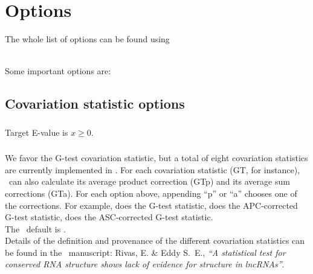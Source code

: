 \clearpage
\section{Options}
\label{section:options}
\setcounter{footnote}{0}

The whole list of options can be found using 

\\

Some important options are:
\subsection{Covariation statistic options}

\subsubsection{}  Target E-value is $x\geq 0$.

\subsubsection{}
We favor the G-test covariation statistic, but a total of eight
covariation statistics are currently implemented in \rscape. For each
covariation statistic (GT, for instance), \rscape\ can also calculate
its average product correction (GTp) and its average sum corrections
(GTa). For each option above, appending ``p'' or ``a'' chooses one of the
corrections. For example,  does the G-test statistic,
 does the APC-corrected G-test statistic, 
does the ASC-corrected G-test statistic.\\

The \rscape\ default is .\\

Details of the definition and provenance of the different covariation
statistics can be found in the \rscape\ manuscript: Rivas, E. \& Eddy
S.~E., \textit{``A statistical test for conserved RNA structure shows
lack of evidence for structure in lncRNAs''}.

